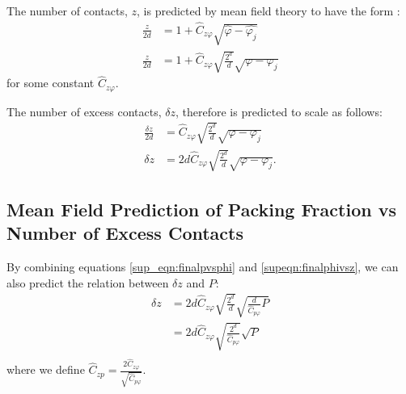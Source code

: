 The number of contacts, $z$, is predicted by mean field theory to have the form \cite{parisi_theory_2020}:
%
\begin{align}
\frac{z}{2d} &=1 + \hat{C}_{z\varphi}\sqrt{\hat{\varphi}-\hat{\varphi_j}} \\
\frac{z}{2d} &=1 + \hat{C}_{z\varphi}\sqrt{\frac{2^d}{d}}\sqrt{\varphi-\varphi_j} \label{eqn:meanFieldExcessPhi}
\end{align}
%
for some constant $\hat{C}_{z\varphi}$. 

The number of excess contacts, $\delta z$, therefore is predicted to scale as follows:
\begin{align}
\frac{\delta z}{2d} &= \hat{C}_{z\varphi}\sqrt{\frac{2^d}{d}}\sqrt{\varphi - \varphi_j} \\ %
\delta z &= 2d\hat{C}_{z\varphi}\sqrt{\frac{2^d}{d}}\sqrt{\varphi - \varphi_j} \label{supeqn:finalphivsz}.
\end{align}


\subsection{Mean Field Prediction of Packing Fraction vs Number of Excess Contacts}

By combining equations \ref{sup_eqn:finalpvsphi} 
and \ref{supeqn:finalphivsz},
we can also predict the relation between $\delta z$ and $P$:
%
\begin{align}
 \delta z &= 2d\hat{C}_{z\varphi}\sqrt{\frac{2^d}{d}} \sqrt{\frac{d}{\hat{C}_{p\varphi}}P} \\
 &= 2d\hat{C}_{z\varphi}\sqrt{\frac{2^d}{\hat{C}_{p\varphi}}} \sqrt{P} \\
\end{align}
%
where we define $\hat{C}_{zp}=\frac{2\hat{C}_{z\varphi}}{\sqrt{\hat{C}_{p\varphi}}}$.


